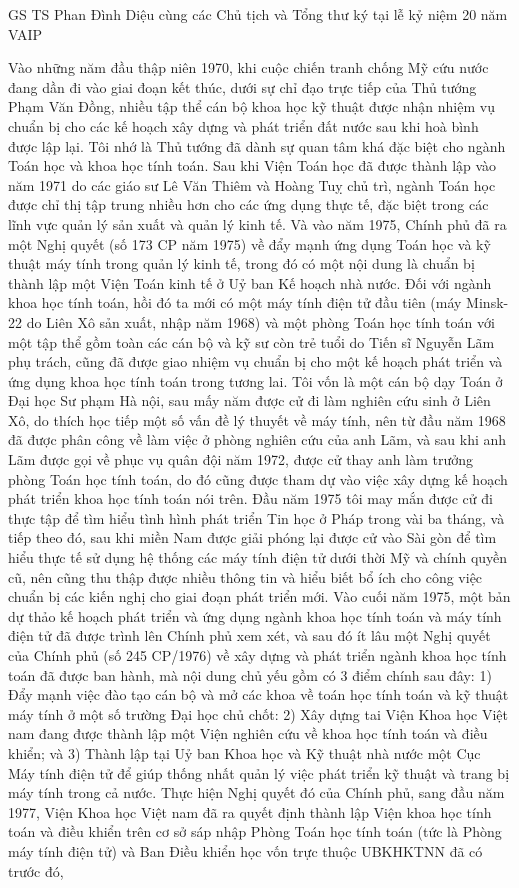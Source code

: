 GS TS Phan Đình Diệu cùng các Chủ tịch và Tổng thư ký tại lễ kỷ niệm 20 năm VAIP
                        
                        Vào những năm đầu thập niên 1970, khi cuộc chiến tranh chống Mỹ cứu nước đang dần đi vào giai đoạn kết thúc, dưới sự chỉ đạo trực tiếp của Thủ tướng Phạm Văn Đồng, nhiều tập thể cán bộ khoa học kỹ thuật được nhận nhiệm vụ chuẩn bị cho các kế hoạch xây dựng và phát triển đất nước sau khi hoà bình được lập lại. Tôi nhớ là Thủ tướng đã dành sự quan tâm khá đặc biệt cho ngành Toán học và khoa học tính toán. Sau khi Viện Toán học đã được thành lập vào năm 1971 do các giáo sư Lê Văn Thiêm và Hoàng Tuỵ chủ trì, ngành Toán học được chỉ thị tập trung nhiều hơn cho các ứng dụng thực tế, đặc biệt trong các lĩnh vực quản lý sản xuất và quản lý kinh tế. Và vào năm 1975, Chính phủ đã ra một Nghị quyết (số 173 CP năm 1975) về đẩy mạnh ứng dụng Toán học và kỹ thuật máy tính trong quản lý kinh tế, trong đó có một nội dung là chuẩn bị thành lập một Viện Toán kinh tế  ở Uỷ ban Kế hoạch nhà nước. Đối với ngành khoa học tính toán, hồi đó ta mới có một máy tính điện tử đầu tiên (máy Minsk-22 do Liên Xô sản xuất, nhập năm 1968) và một phòng Toán học tính toán với một tập thể gồm toàn các cán bộ và kỹ sư còn trẻ tuổi do Tiến sĩ Nguyễn Lãm phụ trách, cũng đã được giao nhiệm vụ chuẩn bị cho một kế hoạch phát triển và ứng dụng khoa học tính toán trong tương lai. Tôi vốn là một cán bộ dạy Toán ở Đại học Sư phạm Hà nội, sau mấy năm được cử đi làm nghiên cứu sinh ở Liên Xô, do thích học tiếp một số vấn đề lý thuyết về máy tính, nên từ đầu năm 1968 đã được phân công về làm việc ở phòng nghiên cứu của anh Lãm, và sau khi anh Lãm được gọi về phục vụ quân đội năm 1972, được cử thay anh làm trưởng phòng Toán học tính toán, do đó cũng được tham dự vào việc xây dựng kế hoạch phát triển khoa học tính toán nói trên. Đầu năm 1975 tôi may mắn được cử đi thực tập  để tìm hiểu tình hình phát triển Tin học ở Pháp trong vài ba tháng, và tiếp theo đó, sau khi miền Nam được giải phóng lại được cử vào Sài gòn để tìm hiểu thực tế sử dụng hệ thống các máy tính điện tử dưới thời Mỹ và chính quyền cũ, nên cũng thu thập được nhiều thông tin và hiểu biết bổ ích cho công việc chuẩn bị các kiến nghị cho giai đoạn phát triển mới. Vào cuối năm 1975, một bản dự thảo kế hoạch phát triển và ứng dụng ngành khoa học tính toán và máy tính điện tử  đã được trình lên Chính phủ xem xét, và sau đó ít lâu một Nghị quyết của Chính phủ (số 245 CP/1976) về xây dựng và phát triển ngành khoa học tính toán đã được ban hành, mà nội dung chủ yếu gồm có 3 điểm chính sau đây: 1) Đẩy mạnh việc đào tạo cán bộ và mở các khoa về toán học tính toán và kỹ thuật máy tính ở một số trường Đại học chủ chốt: 2) Xây dựng tai Viện Khoa học Việt nam đang được thành lập một Viện nghiên cứu về khoa học tính toán và điều khiển; và 3) Thành lập tại Uỷ ban Khoa học và Kỹ thuật nhà nước  một Cục Máy tính điện tử  để giúp thống nhất quản lý việc phát triển kỹ thuật và trang bị máy tính trong cả nước. Thực hiện Nghị quyết đó của Chính phủ, sang đầu năm 1977, Viện Khoa học Việt nam đã ra quyết định thành lập  Viện khoa học tính toán và điều khiển trên cơ sở sáp nhập Phòng Toán học tính toán (tức là Phòng máy tính điện tử) và Ban Điều khiển học vốn trực thuộc UBKHKTNN đã có trước đó, 